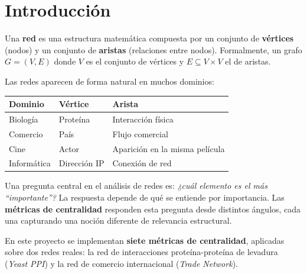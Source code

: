 \section{Introducción}

Una \textbf{red} es una estructura matemática compuesta por un conjunto de \textbf{vértices}
(nodos) y un conjunto de \textbf{aristas} (relaciones entre nodos). Formalmente, un grafo
$G = (V, E)$ donde $V$ es el conjunto de vértices y $E \subseteq V \times V$ el de aristas.

Las redes aparecen de forma natural en muchos dominios:

\begin{center}
\begin{tabular}{lll}
\toprule
\textbf{Dominio} & \textbf{Vértice} & \textbf{Arista} \\
\midrule
Biología & Proteína & Interacción física \\
Comercio & País & Flujo comercial \\
Cine & Actor & Aparición en la misma película \\
Informática & Dirección IP & Conexión de red \\
\bottomrule
\end{tabular}
\end{center}

Una pregunta central en el análisis de redes es: \textit{¿cuál elemento es el más
``importante''?} La respuesta depende de qué se entiende por importancia. Las
\textbf{métricas de centralidad} responden esta pregunta desde distintos ángulos,
cada una capturando una noción diferente de relevancia estructural.

En este proyecto se implementan \textbf{siete métricas de centralidad}, aplicadas
sobre dos redes reales: la red de interacciones proteína-proteína de levadura (\textit{Yeast PPI})
y la red de comercio internacional (\textit{Trade Network}).
